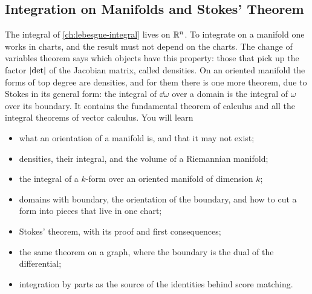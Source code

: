 \begin{notechapter}
\chapter{Integration on Manifolds and Stokes' Theorem}
\label{ch:stokes}

\begin{chapterintro}
The integral of \cref{ch:lebesgue-integral} lives on $\mathbb{R}^n$. To
integrate on a manifold one works in charts, and the result must not
depend on the charts. The change of variables theorem says which
objects have this property: those that pick up the factor
$\left|\det\right|$ of the Jacobian matrix, called densities. On an oriented
manifold the forms of top degree are densities, and for them there is
one more theorem, due to Stokes in its general form: the integral of
$\dd\omega$ over a domain is the integral of $\omega$ over its
boundary. It contains the fundamental theorem of calculus and all the
integral theorems of vector calculus. You will learn
\begin{itemize}[nosep]
  \item what an orientation of a manifold is, and that it may not exist;
  \item densities, their integral, and the volume of a Riemannian
        manifold;
  \item the integral of a $k$-form over an oriented manifold of
        dimension $k$;
  \item domains with boundary, the orientation of the boundary, and how
        to cut a form into pieces that live in one chart;
  \item Stokes' theorem, with its proof and first consequences;
  \item the same theorem on a graph, where the boundary is the dual of
        the differential;
  \item integration by parts as the source of the identities behind
        score matching.
\end{itemize}
\end{chapterintro}


\end{notechapter}
